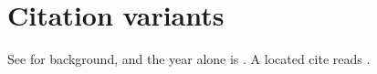 \section{Citation variants}

See \citealp{stokey1989recursive, puterman2005markov} for background, and the
year alone is \citeyearpar{bellman1957dynamic}. A located cite reads
\citep[p.~5]{hernandez2012discrete}.
